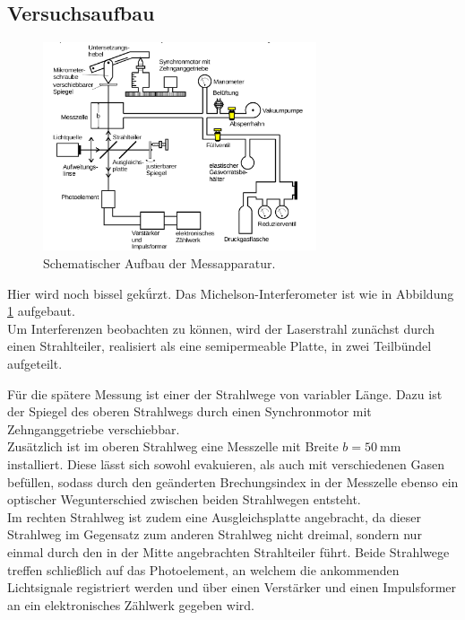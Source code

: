 \subsection{Versuchsaufbau}
\label{sec:Versuchsaufbau}
\begin{figure}
	\centering
	\includegraphics[width=0.72\textwidth]{Bilder/aufbau.png}
	\caption{Schematischer Aufbau der Messapparatur. \cite{Anleitung}}
  \label{fig:aufbau}
\end{figure}
Hier wird noch bissel gekǘrzt.
Das Michelson-Interferometer ist wie in Abbildung \ref{fig:aufbau} aufgebaut.\\
Um Interferenzen beobachten zu können, wird der Laserstrahl zunächst durch einen Strahlteiler, realisiert als eine semipermeable Platte, in zwei Teilbündel aufgeteilt.

Für die spätere Messung ist einer der Strahlwege von variabler Länge. Dazu ist der Spiegel
des oberen Strahlwegs durch einen Synchronmotor mit Zehnganggetriebe verschiebbar.
\\Zusätzlich ist im oberen Strahlweg eine Messzelle mit Breite $b=\SI{50}{\milli\meter}$ installiert.
Diese lässt sich sowohl evakuieren, als auch mit verschiedenen Gasen befüllen, sodass durch den geänderten Brechungsindex in der Messzelle ebenso ein optischer Wegunterschied zwischen beiden Strahlwegen entsteht. \\
Im rechten Strahlweg ist zudem eine Ausgleichsplatte angebracht, da dieser Strahlweg im Gegensatz zum anderen Strahlweg nicht dreimal, sondern nur einmal durch den in der Mitte angebrachten Strahlteiler führt.
Beide Strahlwege treffen schließlich auf das Photoelement, an welchem die ankommenden Lichtsignale registriert werden und über einen Verstärker und einen Impulsformer an ein elektronisches Zählwerk gegeben wird.

